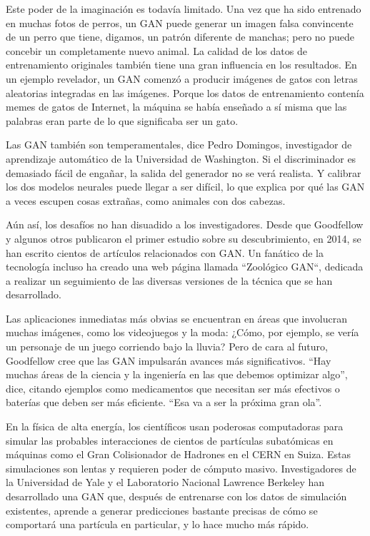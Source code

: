 \documentclass[a4paper]{article}
\begin{document}
Este poder de la imaginación es todavía limitado. Una vez que ha 
sido entrenado en muchas fotos de perros, un GAN puede generar un
imagen falsa convincente de un perro que tiene, digamos, un patrón 
diferente de manchas; pero no puede concebir un completamente 
nuevo animal. La calidad de los datos de entrenamiento originales 
también tiene una gran influencia en los resultados. En un ejemplo 
revelador, un GAN comenzó a producir imágenes de gatos con letras 
aleatorias integradas en las imágenes. Porque los datos de 
entrenamiento contenía memes de gatos de Internet, la máquina se 
había enseñado a sí misma que las palabras eran parte de lo que 
significaba ser un gato.

Las GAN también son temperamentales, dice Pedro Domingos, 
investigador de aprendizaje automático de la Universidad de 
Washington. Si el
discriminador es demasiado fácil de engañar, la salida del 
generador no se verá realista. Y calibrar los dos modelos 
neurales puede llegar a ser difícil, lo que explica por qué las 
GAN a veces escupen cosas extrañas, como animales con dos cabezas.

Aún así, los desafíos no han disuadido a los investigadores. Desde 
que Goodfellow y algunos otros publicaron el primer estudio sobre 
su descubrimiento, en 2014, se han escrito cientos de artículos 
relacionados con GAN. Un fanático de la tecnología incluso ha 
creado una web página llamada ``Zoológico GAN``, dedicada a 
realizar un seguimiento de las diversas versiones de la técnica 
que se han desarrollado.

Las aplicaciones inmediatas más obvias se encuentran en áreas que 
involucran muchas imágenes, como los videojuegos y la moda:
¿Cómo, por ejemplo, se vería un personaje de un juego corriendo 
bajo la lluvia? Pero de cara al futuro, Goodfellow cree que las 
GAN impulsarán avances más significativos. “Hay muchas áreas de la 
ciencia y la ingeniería en las que debemos
optimizar algo”, dice, citando ejemplos como medicamentos que 
necesitan ser más efectivos o baterías que deben
ser más eficiente. “Esa va a ser la próxima gran ola”.

En la física de alta energía, los científicos usan poderosas 
computadoras para simular las probables interacciones de cientos 
de partículas subatómicas en máquinas como el Gran Colisionador de 
Hadrones en el CERN en Suiza. Estas simulaciones son lentas y 
requieren poder de cómputo masivo. Investigadores de la 
Universidad de Yale y el Laboratorio Nacional Lawrence Berkeley 
han desarrollado una GAN que, después de entrenarse con los datos 
de simulación existentes, aprende a generar predicciones bastante 
precisas de cómo se comportará una partícula en particular, y lo 
hace mucho más rápido.
\end{document}

